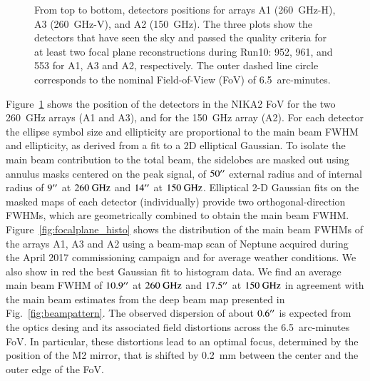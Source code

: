 \documentclass[]{aa} %
\begin{document}
\begin{figure}[h]
      \caption{From top to bottom, detectors positions for arrays A1 (260~GHz-H), A3 (260~GHz-V), and A2 (150~GHz). The three plots show the detectors that have seen the sky and passed the quality criteria for at least two focal plane reconstructions during Run10: 952, 961, and 553 for A1, A3 and A2, respectively. The outer dashed line circle corresponds to the nominal Field-of-View (FoV) of 6.5~arc-minutes.
         \label{fig:focalplane}}
\end{figure}

Figure~\ref{fig:focalplane} shows the position of the detectors in the NIKA2 FoV for the two 260~GHz arrays (A1 and A3), and for the 150~GHz array (A2). For each detector the ellipse symbol size and ellipticity are proportional to the main beam FWHM and ellipticity, as derived from a fit to a 2D elliptical Gaussian. To isolate the main beam contribution to the total beam, the sidelobes are masked out using annulus masks centered on the peak signal, of $50\hbox{$^{\prime\prime}$}$ external radius and of internal radius of $9\hbox{$^{\prime\prime}$}$ at $260~\rm{GHz}$ and $14\hbox{$^{\prime\prime}$}$ at $150~\rm{GHz}$. Elliptical 2-D Gaussian fits on the masked maps of each detector (individually) provide two orthogonal-direction FWHMs, which are geometrically combined to obtain the main beam FWHM. Figure~\ref{fig:focalplane_histo} shows the distribution of the main beam FWHMs of the arrays A1, A3 and A2 using a beam-map scan of Neptune acquired during the April 2017 commissioning campaign and for average weather conditions. We also show in red the best Gaussian fit to histogram data. We find an average main beam FWHM of $10.9\hbox{$^{\prime\prime}$}$ at $260~\rm{GHz}$ and $17.5\hbox{$^{\prime\prime}$}$ at $150~\rm{GHz}$ in agreement with the main beam estimates from the deep beam map presented in Fig.~\ref{fig:beampattern}. The observed dispersion of about $0.6\hbox{$^{\prime\prime}$}$ is expected from the optics desing and its associated field distortions across the 6.5~arc-minutes FoV. In particular, these distortions lead to an optimal focus, determined by the position of the M2 mirror, that is shifted by 0.2~\rm{mm} between the center and the outer edge of the FoV.
 
\end{document}
